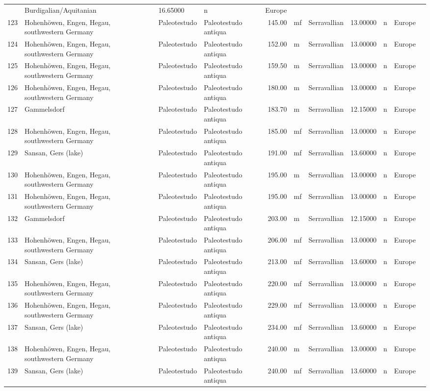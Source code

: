 \begin{landscape}
{\begin{longtable}[]{@{}llllrllrlll@{}}
	& Burdigalian/Aquitanian & 16.65000 & n & Europe\tabularnewline
	123 & Hohenhöwen, Engen, Hegau, southwestern Germany & Paleotestudo &
	Paleotestudo antiqua & 145.00 & mf & Serravallian & 13.00000 & n &
	Europe\tabularnewline
	124 & Hohenhöwen, Engen, Hegau, southwestern Germany & Paleotestudo &
	Paleotestudo antiqua & 152.00 & m & Serravallian & 13.00000 & n &
	Europe\tabularnewline
	125 & Hohenhöwen, Engen, Hegau, southwestern Germany & Paleotestudo &
	Paleotestudo antiqua & 159.50 & m & Serravallian & 13.00000 & n &
	Europe\tabularnewline
	126 & Hohenhöwen, Engen, Hegau, southwestern Germany & Paleotestudo &
	Paleotestudo antiqua & 180.00 & m & Serravallian & 13.00000 & n &
	Europe\tabularnewline
	127 & Gammelsdorf & Paleotestudo & Paleotestudo antiqua & 183.70 & m &
	Serravallian & 12.15000 & n & Europe\tabularnewline
	128 & Hohenhöwen, Engen, Hegau, southwestern Germany & Paleotestudo &
	Paleotestudo antiqua & 185.00 & mf & Serravallian & 13.00000 & n &
	Europe\tabularnewline
	129 & Sansan, Gers (lake) & Paleotestudo & Paleotestudo antiqua & 191.00
	& mf & Serravallian & 13.60000 & n & Europe\tabularnewline
	130 & Hohenhöwen, Engen, Hegau, southwestern Germany & Paleotestudo &
	Paleotestudo antiqua & 195.00 & m & Serravallian & 13.00000 & n &
	Europe\tabularnewline
	131 & Hohenhöwen, Engen, Hegau, southwestern Germany & Paleotestudo &
	Paleotestudo antiqua & 195.00 & mf & Serravallian & 13.00000 & n &
	Europe\tabularnewline
	132 & Gammelsdorf & Paleotestudo & Paleotestudo antiqua & 203.00 & m &
	Serravallian & 12.15000 & n & Europe\tabularnewline
	133 & Hohenhöwen, Engen, Hegau, southwestern Germany & Paleotestudo &
	Paleotestudo antiqua & 206.00 & mf & Serravallian & 13.00000 & n &
	Europe\tabularnewline
	134 & Sansan, Gers (lake) & Paleotestudo & Paleotestudo antiqua & 213.00
	& mf & Serravallian & 13.60000 & n & Europe\tabularnewline
	135 & Hohenhöwen, Engen, Hegau, southwestern Germany & Paleotestudo &
	Paleotestudo antiqua & 220.00 & mf & Serravallian & 13.00000 & n &
	Europe\tabularnewline
	136 & Hohenhöwen, Engen, Hegau, southwestern Germany & Paleotestudo &
	Paleotestudo antiqua & 229.00 & mf & Serravallian & 13.00000 & n &
	Europe\tabularnewline
	137 & Sansan, Gers (lake) & Paleotestudo & Paleotestudo antiqua & 234.00
	& mf & Serravallian & 13.60000 & n & Europe\tabularnewline
	138 & Hohenhöwen, Engen, Hegau, southwestern Germany & Paleotestudo &
	Paleotestudo antiqua & 240.00 & m & Serravallian & 13.00000 & n &
	Europe\tabularnewline
	139 & Sansan, Gers (lake) & Paleotestudo & Paleotestudo antiqua & 240.00
	& mf & Serravallian & 13.60000 & n & Europe\tabularnewline

\end{longtable}}
\end{landscape}
